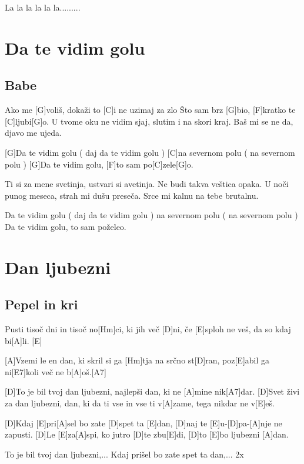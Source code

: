 \documentclass[a4paper,12pt]{article}
\begin{document}
\begin{multicols}{2}
\begin{guitar}
La la la la la la.........

\end{guitar}
\section{Da te vidim golu}
\subsection*{Babe}
\begin{guitar}
Ako me [G]voliš, dokaži to [C]i ne uzimaj za zlo
Što sam brz [G]bio, [F]kratko te [C]ljubi[G]o.
U tvome oku ne vidim sjaj, slutim i na skori kraj.
Baš mi se ne da, djavo me ujeda.

	     
[G]Da te vidim golu  ( daj da te vidim golu ) 
[C]na severnom polu ( na severnom polu ) 
[G]Da te vidim golu, [F]to sam po[C]zele[G]o.

Ti si za mene svetinja, ustvari si avetinja.
Ne budi takva veštica opaka.
U noči punog meseca, strah mi dušu preseča.
Srce mi kalnu na tebe brutalnu.

Da te vidim golu ( daj da te vidim golu ) 
na severnom polu ( na severnom polu )
Da te vidim golu, to sam poželeo.

\end{guitar}
\section{Dan ljubezni}
\subsection*{Pepel in kri}
\begin{guitar}
[A]Pusti tisoč dni in tisoč no[Hm]ci, ki jih več [D]ni,
če [E]sploh ne veš, da so kdaj bi[A]li. [E]


[A]Vzemi le en dan,
ki skril si ga [Hm]tja na srčno st[D]ran,
poz[E]abil ga ni[E7]koli več ne b[A]oš.[A7]


[D]To je bil tvoj dan ljubezni,
najlepši dan, ki ne [A]mine nik[A7]dar.
[D]Svet živi za dan ljubezni,
dan, ki da ti vse in vse ti v[A]zame,
tega nikdar ne v[E]eš.


[D]Kdaj [E]pri[A]sel bo zate [D]spet ta [E]dan,
[D]naj te [E]u-[D]pa-[A]nje ne zapusti.
[D]Le [E]za[A]spi, ko jutro [D]te zbu[E]di,
[D]to [E]bo ljubezni [A]dan.


To je bil tvoj dan ljubezni,...
Kdaj prišel bo zate spet ta dan,... 2x

\end{guitar}

\end{multicols}
\end{document}
